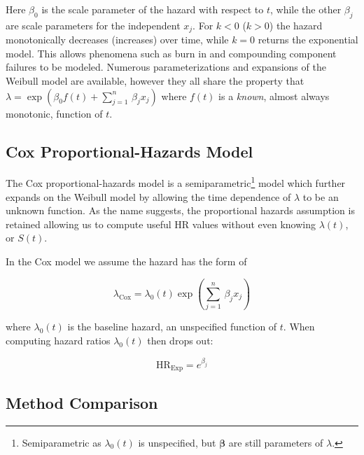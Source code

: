 \noindent Here $\beta_{0}$ is the scale parameter of the hazard with respect to $t$,
while the other $\beta_{j}$ are scale parameters for the independent $x_{j}$.
For $k<0$ ($k>0$) the hazard monotonically decreases (increases) over time,
while $k=0$ returns the exponential model.
This allows phenomena such as burn in and compounding component failures to be modeled.
Numerous parameterizations and expansions of the Weibull model are available,
however they all share the property that
$\lambda = \exp\left(\beta_{0} f\left(t\right) + \sum_{j=1}^{n}\, \beta_{j} x_{j}\right)$
where $f\left(t\right)$ is a {\em known}, almost always monotonic, function of $t$.

\subsection{Cox Proportional-Hazards Model}
\label{additional:Survival:cox}

The Cox proportional-hazards model \cite{cox} is a
semiparametric\footnote{Semiparametric as $\lambda_{0}\left(t\right)$ is unspecified, but $\bm{\beta}$ are still parameters of $\lambda$.} model
which further expands on the Weibull model by allowing
the time dependence of $\lambda$ to be an unknown function.
As the name suggests, the proportional hazards assumption is retained
allowing us to compute useful HR values
without even knowing $\lambda\left(t\right)$, or $S\left(t\right)$.

In the Cox model we assume the hazard has the form of

\begin{equation}\label{eq:Survival:cox_lambda}
\lambda_{\text{Cox}} = \lambda_{0}\left(t\right) \exp\left(\sum_{j=1}^{n}\, \beta_{j} x_{j}\right)
\end{equation}

\noindent where $\lambda_{0}\left(t\right)$ is the baseline hazard, an unspecified function of $t$.
When computing hazard ratios $\lambda_{0}\left(t\right)$ then drops out:

\begin{equation}\label{eq:Survival:cox_HR}
\text{HR}_{\text{Exp}} = e^{\beta_{j}}
\end{equation}

\subsection{Method Comparison}
\label{additional:Survival:comp}

